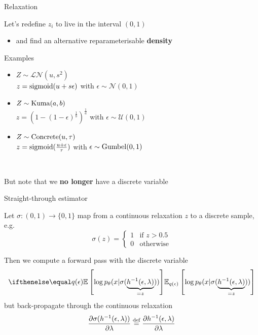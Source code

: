 \begin{frame}{Relaxation}

Let's redefine $z_i$ to live in the interval $(0,1)$
\begin{itemize}
	\item and find an alternative reparameterisable {\bf density}\\
\end{itemize}

\pause

Examples
\begin{itemize}
	\item $Z \sim \mathcal {LN}(u, s^2)$\\
	$z = \operatorname{sigmoid}(u +  s\epsilon)$ with $\epsilon \sim \mathcal N(0, 1)$ \pause	
	\item $Z \sim \operatorname{Kuma}(a, b)$\\
	$z = \left(1 - (1 - \epsilon)^{\frac{1}{b}}\right)^{\frac{1}{a}}$ with $\epsilon \sim \mathcal U(0,1)$ \pause
	\item $Z \sim \operatorname*{Concrete}(u, \tau)$\\
	$z= \operatorname{sigmoid}(\frac{u + \epsilon}{\tau})$ with $\epsilon \sim \operatorname*{Gumbel}(0, 1)$ 
\end{itemize}

~ \pause

But note that we {\bf no longer} have a discrete variable

	
\end{frame}

\begin{frame}{Straight-through estimator}

Let $\sigma: (0,1) \rightarrow \{0,1\}$ map from a continuous relaxation $z$ to a discrete sample, e.g.
\begin{equation}
\sigma(z) = 
\begin{cases}
1 & \text{if }z > 0.5 \\
0 & \text{otherwise}
\end{cases}
\end{equation}

\pause

Then we compute a forward pass with the discrete variable
\begin{equation}
 \E[q(\epsilon)]{\log p_\theta(x|\sigma(\underbrace{h^{-1}(\epsilon, \lambda)}_{=z}))}
 \end{equation} \pause
but back-propagate through the continuous relaxation
\begin{equation}
\pdv{\sigma(h^{-1}(\epsilon, \lambda))}{\lambda} \overset{\text{def}}{=} \pdv{h^{-1}(\epsilon, \lambda)}{\lambda}
\end{equation}


\end{frame}



